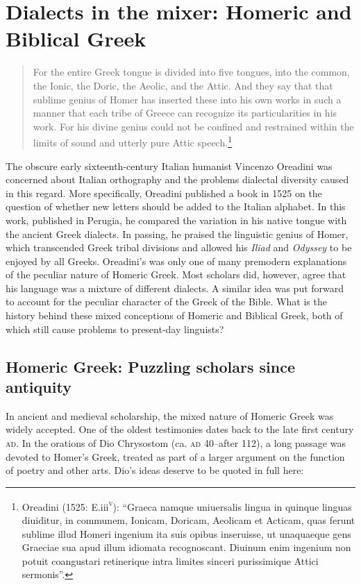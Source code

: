 \chapter{Dialects in the mixer: Homeric and Biblical Greek}
\begin{quote}
For the entire Greek tongue is divided into five tongues, into the common, the Ionic, the Doric, the Aeolic, and the Attic. And they say that that sublime genius of Homer has inserted these into his own works in such a manner that each tribe of Greece can recognize its particularities in his work. For his divine genius could not be confined and restrained within the limits of sound and utterly pure Attic speech.\footnote{Oreadini (1525: E.iii\textsc{\textsuperscript{v}}): “Graeca namque uniuersalis lingua in quinque linguas diuiditur, in communem, Ionicam, Doricam, Aeolicam et Acticam, quas ferunt sublime illud Homeri ingenium ita suis opibus inseruisse, ut unaquaeque gens Graeciae sua apud illum idiomata recognoscant. Diuinum enim ingenium non potuit coangustari retinerique intra limites sinceri purissimique Attici sermonis”.}
\end{quote}

The obscure early sixteenth-century Italian humanist Vincenzo Oreadini was concerned about Italian orthography and the problems dialectal diversity caused in this regard. More specifically, Oreadini published a book in 1525 on the question of whether new letters should be added to the Italian alphabet. In this work, published in Perugia, he compared the variation in his native tongue with the ancient Greek dialects. In passing, he praised the linguistic genius of Homer, which transcended Greek tribal divisions and allowed his \textit{Iliad} and \textit{Odyssey} to be enjoyed by all Greeks. Oreadini’s was only one of many premodern explanations of the peculiar nature of Homeric Greek. Most scholars did, however, agree that his language was a mixture of different dialects. A similar idea was put forward to account for the peculiar character of the Greek of the Bible. What is the history behind these mixed conceptions of Homeric and Biblical Greek, both of which still cause problems to present-day linguists?

\section{Homeric Greek: Puzzling scholars since antiquity}

In ancient and medieval scholarship, the mixed nature of Homeric Greek was widely accepted. One of the oldest testimonies dates back to the late first century \textsc{ad}. In the orations of Dio Chrysostom (ca. \textsc{ad} 40–after 112), a long passage was devoted to Homer’s Greek, treated as part of a larger argument on the function of poetry and other arts. Dio’s ideas deserve to be quoted in full here:

